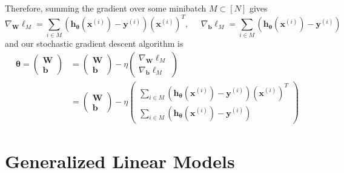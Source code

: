 \documentclass{article}
\theoremstyle{definition}
\begin{document}
  Therefore, summing the gradient over some minibatch $M \subset [N]$ gives 
  \[\nabla_{\mathbf{W}} \ell_M = \sum_{i \in M} (\mathbf{h}_{\boldsymbol{\theta}}(\mathbf{x}^{(i)}) - \mathbf{y}^{(i)}) (\mathbf{x}^{(i)})^T, \;\;\;\;\; \nabla_{\mathbf{b}} \ell_M = \sum_{i \in M} (\mathbf{h}_{\boldsymbol{\theta}}(\mathbf{x}^{(i)}) - \mathbf{y}^{(i)})\]
  and our stochastic gradient descent algorithm is 
  \begin{align*}
      \boldsymbol{\theta} = \begin{pmatrix} \mathbf{W} \\ \mathbf{b} \end{pmatrix} & = \begin{pmatrix} \mathbf{W} \\ \mathbf{b} \end{pmatrix} - \eta \begin{pmatrix} \nabla_{\mathbf{W}} \ell_M \\ \nabla_{\mathbf{b}} \ell_M \end{pmatrix} \\
      & = \begin{pmatrix} \mathbf{W} \\ \mathbf{b} \end{pmatrix} - \eta \begin{pmatrix} \sum_{i \in M} (\mathbf{h}_{\boldsymbol{\theta}}(\mathbf{x}^{(i)}) - \mathbf{y}^{(i)}) (\mathbf{x}^{(i)})^T \\ \sum_{i \in M} (\mathbf{h}_{\boldsymbol{\theta}}(\mathbf{x}^{(i)}) - \mathbf{y}^{(i)}) \end{pmatrix} 
  \end{align*}

\section{Generalized Linear Models}
\end{document}
